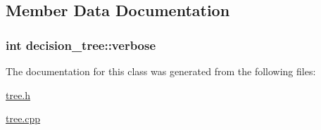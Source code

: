 \subsection{Member Data Documentation}
\hypertarget{classdecision__tree_adef4736597a44918d4e221acbfb3142b}{
\subsubsection[{verbose}]{\setlength{\rightskip}{0pt plus 5cm}int decision\+\_\+tree\+::verbose\hspace{0.3cm}{\ttfamily [private]}}}\label{classdecision__tree_adef4736597a44918d4e221acbfb3142b}


The documentation for this class was generated from the following files\+:\begin{DoxyCompactItemize}
\item 
\hyperlink{tree_8h}{tree.\+h}\item 
\hyperlink{tree_8cpp}{tree.\+cpp}\end{DoxyCompactItemize}
